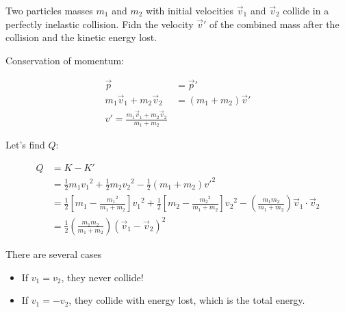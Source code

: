 \begin{example}
	Two particles masses $m_1$ and $m_2$ with initial velocities $\vec v_1$ and $\vec v_2$ collide in a perfectly inelastic collision. Fidn the velocity $\vec v'$ of the combined mass after the collision and the kinetic energy lost.
\end{example}

\begin{sol}
	Conservation of momentum:

	\begin{align}
		\vec p &= \vec p'\\
		m_1 \vec v_1 + m_2 \vec v_2 &= (m_1 + m_2) \vec v'\\
		v' = \boxed{\frac{m_1 \vec v_1 + m_2 \vec v_2}{m_1 + m_2}}
	\end{align}

	Let's find $Q$:

	\begin{align}
		Q &= K - K'\\
		&= \frac{1}{2} m_1 {v_1}^2 + \frac{1}{2} m_2 {v_2}^2 - \frac{1}{2} (m_1 + m_2) {v'}^2\\
		&= \frac{1}{2} \left[m_1 - \frac{{m_1}^2}{m_1 + m_2}\right] {v_1}^2 + \frac{1}{2} \left[m_2 - \frac{{m_2}^2}{m_1 + m_2}\right] {v_2}^2 - \left(\frac{m_1 m_2}{m_1 + m_2}\right) \vec v_1 \cdot \vec v_2\\
		&= \boxed{\frac{1}{2} \left(\frac{m_1 m_2}{m_1 + m_2}\right) (\vec v_1 - \vec v_2)^2}
	\end{align}

	There are several cases

	\begin{itemize}
		\item If $v_1 = v_2$, they never collide!
		\item If $v_1 = - v_2$, they collide with energy lost, which is the total energy.
	\end{itemize}
\end{sol}